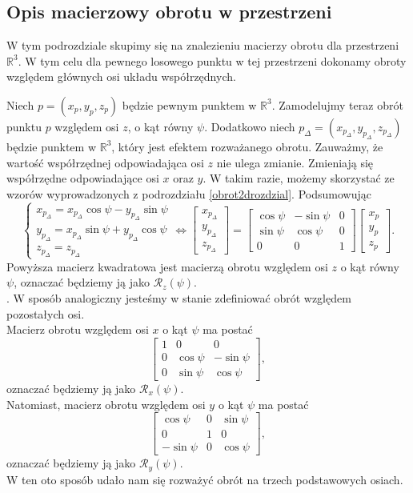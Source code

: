 \documentclass[a4paper,twoside,11pt,reqno]{mwrep}
\theoremstyle{plain} \newtheorem{twr}{Twierdzenie}
\theoremstyle{plain} \newtheorem{lem}{Lemat}
\theoremstyle{definition} \newtheorem{defi}{Definicja}
\theoremstyle{remark} \newtheorem*{wni}{Wniosek}
\theoremstyle{definition} \newtheorem{uwaga}{Uwaga}
\theoremstyle{definition}\newtheorem{prz}{Przykład}
\begin{document}
\subsection{Opis macierzowy obrotu w przestrzeni}
W tym podrozdziale skupimy się na znalezieniu macierzy 
obrotu dla przestrzeni $\mathbb{R}^3$. W tym celu 
dla pewnego losowego punktu w tej przestrzeni dokonamy obroty względem głównych 
osi układu współrzędnych. 

Niech $p=(x_p,y_p,z_p)$ będzie pewnym punktem w $\mathbb{R}^3$. Zamodelujmy teraz
obrót punktu $p$ względem osi $z$, o kąt równy $\psi$. 
Dodatkowo niech $p_\Delta=(x_{p_\Delta},y_{p_\Delta},z_{p_\Delta})$ będzie punktem w $\mathbb{R}^3$, 
który jest efektem rozważanego obrotu. 
Zauważmy, że wartość współrzędnej
odpowiadająca osi $z$ nie ulega zmianie. Zmieniają się współrzędne odpowiadające osi $x$ oraz $y$.
W takim razie, możemy skorzystać ze wzorów wyprowadzonych z podrozdziału \ref{obrot2drozdzial}.
Podsumowując
$$\left\{\begin{array}{l}
x_{p_\Delta} = x_{p_\Delta} \cos\psi - y_{p_\Delta}\sin\psi \\
y_{p_\Delta}=x_{p_\Delta}\sin\psi + y_{p_\Delta}\cos\psi\\
z_{p_\Delta} = z_{p_\Delta}
\end{array}\right. \Longleftrightarrow \begin{bmatrix}
x_{p_\Delta}\\
y_{p_\Delta}\\
z_{p_\Delta}
\end{bmatrix} =
\begin{bmatrix}
\cos\psi   & -\sin\psi&0 \\
\sin\psi & \cos\psi & 0\\
0&0&1
\end{bmatrix}
\begin{bmatrix}
x_{p} \\
y_{p} \\
z_{p}
\end{bmatrix}.$$
Powyższa macierz kwadratowa jest macierzą obrotu względem osi $z$ o kąt równy $\psi$, oznaczać będziemy ją jako $\mathcal{R}_z(\psi)$.\\. 
W sposób analogiczny jesteśmy w stanie zdefiniować obrót względem pozostałych osi.\\
Macierz obrotu względem osi $x$ o kąt $\psi$ ma postać
 $$\begin{bmatrix}
 1&0&0\\
0&\cos\psi   & -\sin\psi\\
0&\sin\psi & \cos\psi
\end{bmatrix},$$
oznaczać będziemy ją jako $\mathcal{R}_x(\psi)$.\\
Natomiast, macierz obrotu względem osi $y$ o kąt $\psi$ ma postać
$$\begin{bmatrix}
\cos\psi&0&\sin\psi\\
0&1   & 0\\
-\sin\psi &0 & \cos\psi
\end{bmatrix},$$
oznaczać będziemy ją jako $\mathcal{R}_y(\psi)$.\\
W ten oto sposób udało nam się rozważyć obrót na trzech podstawowych osiach.
\end{document}
